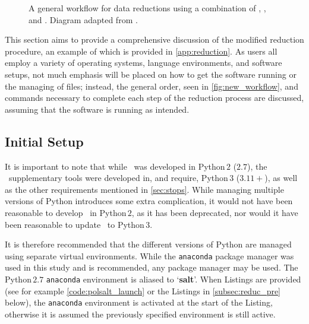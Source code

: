 \begin{figure}[t]
    \caption{
        A general workflow for data reductions using a combination of \polsalt, \iraf, and \stops.
        Diagram adapted from \cite{Cooper_HEASA2021}.
    }
    \label{fig:new_workflow}
\end{figure}

This section aims to provide a comprehensive discussion of the modified reduction procedure, an example of which is provided in \autoref{app:reduction}.
As users all employ a variety of operating systems, language environments, and software setups, not much emphasis will be placed on how to get the software running or the managing of files; instead, the general order, seen in \autoref{fig:new_workflow}, and commands necessary to complete each step of the reduction process are discussed, assuming that the software is running as intended.

\subsection{Initial Setup} \label{subsec:reduc_setup}

It is important to note that while \polsalt\ was developed in Python\,$2$ ($2.7$), the \stops\ supplementary tools were developed in, and require, Python\,$3$ ($3.11+$), as well as the other requirements mentioned in \autoref{sec:stops}.
While managing multiple versions of Python introduces some extra complication, it would not have been reasonable to develop \stops\ in Python\,$2$, as it has been deprecated, nor would it have been reasonable to update \polsalt\ to Python\,$3$.

It is therefore recommended that the different versions of Python are managed using separate virtual environments.
While the \texttt{anaconda} package manager was used in this study and is recommended, any package manager may be used.
The Python\,$2.7$ \texttt{anaconda} environment is aliased to `\textbf{salt}'.
When Listings are provided (see for example \autoref{code:polsalt_launch} or the Listings in \autoref{subsec:reduc_pre} below), the \texttt{anaconda} environment is activated at the start of the Listing, otherwise it is assumed the previously specified environment is still active.

